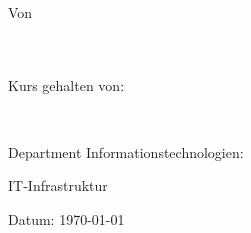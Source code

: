 

\begin{titlepage}
\begin{center}
    \vspace*{-5,7cm}
    \hspace*{-1,45cm}
    
    \vspace{2.3cm}
    

    \vspace{1cm}
    {\textbf{\Titel\\}}
    \vspace{2.4cm}
    
    {} \\
    \vspace{0.5cm}
    {}\\
    \vspace{0.5cm}
    Von\\
    \SchuelerName \\ \SchuelerPKZ\\
    \vspace{0.9cm}
    {\begin{singlespace}Kurs gehalten von:\\\end{singlespace}}
    {\begin{singlespace}\Lehrer\\\end{singlespace}}


\end{center}
{\raggedleft\vfill{\begin{singlespace}
     Department Informationstechnologien:\\
\end{singlespace}
 IT-Infrastruktur\\
 \begin{singlespace}
 Datum: \today\\
 
 
 \end{singlespace}
}\par
}
\end{titlepage}